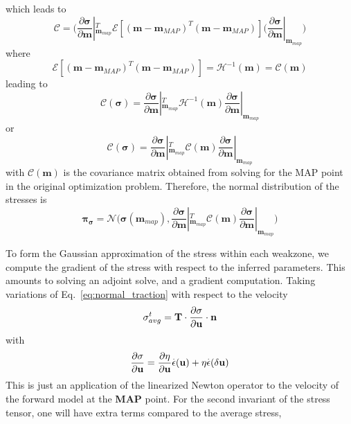 \documentclass[12pt]{article}
\newcommand{\mm}{{\ensuremath{\boldsymbol{m}}}}
\newcommand{\ppi}{{\ensuremath{\boldsymbol{\pi}}}}
\newcommand{\ssigma}{{\ensuremath{\boldsymbol{\sigma}}}}
\begin{document}
which leads to
\begin{equation}
\mathcal C = \big(\frac{\partial\ssigma}{\partial \mm}|_{\mm_{map}}^T \mathcal E[(\mm-\mm_{MAP})^T(\mm-\mm_{MAP})](\frac{\partial\ssigma}{\partial \mm}|_{\mm_{map}}\big)
\end{equation}
where 
\begin{equation}
  \mathcal E[(\mm-\mm_{MAP})^T(\mm-\mm_{MAP})] = \mathcal H^{-1}(\mm) = \mathcal C(\mm)
  \end{equation}
leading to
\begin{equation}
\mathcal C(\ssigma) = \frac{\partial\ssigma}{\partial \mm}|_{\mm_{map}}^T \mathcal H^{-1}(\mm)\frac{\partial\ssigma}{\partial \mm}|_{\mm_{map}}
\end{equation}
or 
\begin{equation}
\mathcal C(\ssigma) = \frac{\partial\ssigma}{\partial \mm}|_{\mm_{map}}^T \mathcal C(\mm)\frac{\partial\ssigma}{\partial \mm}|_{\mm_{map}}
\end{equation}
with $\mathcal C(\mm)$ is the covariance matrix obtained from solving for the MAP point in the original optimization problem. Therefore, the normal distribution of the stresses is
\begin{equation}
  \ppi_{\ssigma} = \mathcal N\big(\ssigma(\mm_{map}), \frac{\partial\ssigma}{\partial \mm}|_{\mm_{map}}^T \mathcal C(\mm)\frac{\partial\ssigma}{\partial \mm}|_{\mm_{map}}\big)
\end{equation}

To form the Gaussian approximation of the stress within each weakzone, we compute the gradient of the stress with respect to the inferred parameters. This amounts to solving an adjoint solve, and a gradient computation. Taking variations of Eq.~\eqref{eq:normal_traction} with respect to the velocity
\begin{equation}
\sigma^t_{avg}=\textbf{T}\cdot\frac{\partial\sigma}{\partial \textbf u}\cdot \textbf n
\end{equation}
with
\begin{equation}
\frac{\partial\sigma}{\partial \textbf u} = \frac{\partial \eta}{\partial \textbf u}\overset{.}{\epsilon}(\textbf u)
                                            + \eta\overset{.}{\epsilon}(\delta \textbf u)
\end{equation}
This is just an application of the linearized Newton operator to the velocity of the forward model at the \textbf{MAP} point.
For the second invariant of the stress tensor, one will have extra terms compared to the average stress,
\end{document}

